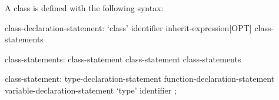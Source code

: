 A class is defined with the following syntax:
\begin{syntax}
class-declaration-statement:
  `class' identifier inherit-expression[OPT] {
    class-statements }

class-statements:
  class-statement
  class-statement class-statements

class-statement:
  type-declaration-statement
  function-declaration-statement
  variable-declaration-statement
  `type' identifier ;
\end{syntax}
